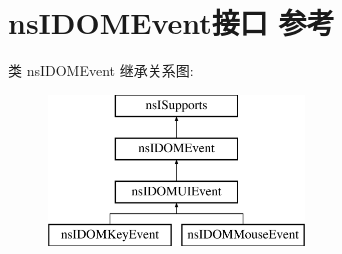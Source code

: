\hypertarget{interfacens_i_d_o_m_event}{}\section{ns\+I\+D\+O\+M\+Event接口 参考}
\label{interfacens_i_d_o_m_event}
类 ns\+I\+D\+O\+M\+Event 继承关系图\+:\begin{figure}[H]
\begin{center}
\leavevmode
\includegraphics[height=4.000000cm]{interfacens_i_d_o_m_event}
\end{center}
\end{figure}
